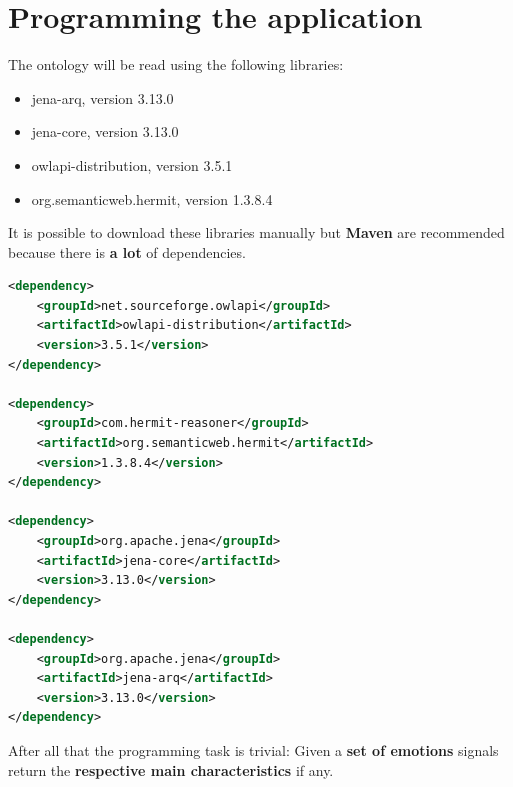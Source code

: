 \documentclass[conference]{IEEEtran}
\begin{document}
\section{Programming the application}
The ontology will be read using the following libraries:
\begin{itemize}
	\item jena-arq, version 3.13.0
	\item jena-core, version 3.13.0
	\item owlapi-distribution, version 3.5.1
	\item org.semanticweb.hermit, version 1.3.8.4
\end{itemize}
It is possible to download these libraries manually but \textbf{Maven} are recommended because there is \textbf{a lot} of dependencies.

\begin{lstlisting}[language=XML, caption={Needed libraries}, label={lst:dependecies}]
<dependency>
	<groupId>net.sourceforge.owlapi</groupId>
	<artifactId>owlapi-distribution</artifactId>
	<version>3.5.1</version>
</dependency>

<dependency>
	<groupId>com.hermit-reasoner</groupId>
	<artifactId>org.semanticweb.hermit</artifactId>
	<version>1.3.8.4</version>
</dependency>

<dependency>
	<groupId>org.apache.jena</groupId>
	<artifactId>jena-core</artifactId>
	<version>3.13.0</version>
</dependency>

<dependency>
	<groupId>org.apache.jena</groupId>
	<artifactId>jena-arq</artifactId>
	<version>3.13.0</version>
</dependency>
\end{lstlisting}
After all that the programming task is trivial: Given a \textbf{set of emotions} signals return the \textbf{respective main characteristics} if any.
\end{document}

